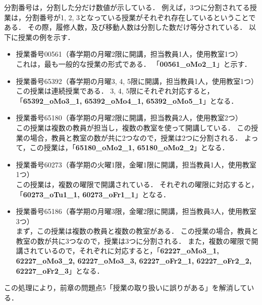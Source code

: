 \documentclass[12pt, a4paper, fleqn]{jreport}
\begin{document}
\begin{itemize}
\vspace{-10mm}
分割番号は，分割した分だけ数値が示している．
例えば，3つに分割されてる授業は，分割番号が1, 2, 3となっている授業がそれぞれ存在しているということである．
その際，履修人数，及び移動人数は分割した数だけ等分されている．
以下に授業の例を示す．\\
\vspace{-5mm}
\begin{itemize}
\item 授業番号00561（春学期の月曜2限に開講，担当教員1人，使用教室1つ）\\
これは，最も一般的な授業の形式である．
「{\bf 00561\_oMo2\_1}」と示す．
\item 授業番号65392（春学期の月曜3, 4, 5限に開講，担当教員1人，使用教室1つ）\\
この授業は連続授業である．
3, 4, 5限にそれぞれ対応すると，「{\bf 65392\_oMo3\_1, 65392\_oMo4\_1, 65392\_oMo5\_1}」となる．
\item 授業番号65180（春学期の月曜2限に開講，担当教員2人，使用教室2つ）\\
この授業は複数の教員が担当し，複数の教室を使って開講している．
この授業の場合，教員と教室の数が共に2つなので，授業は2つに分割される．
よって，この授業は，「{\bf 65180\_oMo2\_1, 65180\_oMo2\_2}」となる．
\item 授業番号60273（春学期の火曜1限，金曜1限に開講，担当教員1人，使用教室1つ）\\
この授業は，複数の曜限で開講されている．
それぞれの曜限に対応すると，\\
「{\bf 60273\_oTu1\_1, 60273\_oFr1\_1}」となる．
\item 授業番号65186（春学期の月曜3限，金曜2限に開講，担当教員3人，使用教室3つ）\\
まず，この授業は複数の教員と複数の教室がある．
この授業の場合，教員と教室の数が共に3つなので，授業は3つに分割される．
また，複数の曜限で開講されているので，それぞれに対応すると，「{\bf 62227\_oMo3\_1, 62227\_oMo3\_2, 62227\_oMo3\_3, 62227\_oFr2\_1, 62227\_oFr2\_2, 62227\_oFr2\_3}」となる．
\end{itemize}
\vspace{3.0mm}
この処理により，前章の問題点5「授業の取り扱いに誤りがある」を解消している．


\end{itemize}
\end{document}
